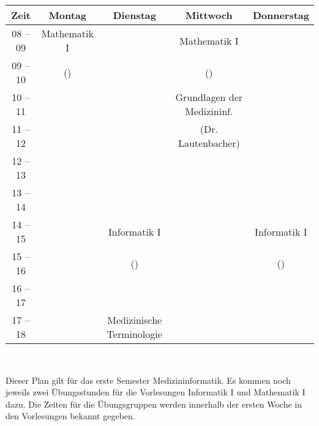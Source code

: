 \begin{minipage}{\textwidth}
    \footnotesize
\begin{center}
\begin{tabular}{|c|c|c|c|c|} 
	\hline
	Zeit    & Montag       & Dienstag             & Mittwoch                          & Donnerstag                          \\ 
	\hline\hline
	08 – 09 & Mathematik I &                      & Mathematik I                      &                                   \\ 
	\cline{1-1}\cline{3-3}\cline{5-5}
	09 – 10 & (\Matheprof)      &                      & (\Matheprof)                           &   \\
	\hline
	10 – 11 &              &                      &     Grundlagen der Medizininf.                              &                                   \\ 
	\cline{1-3}\cline{5-5}
	11 – 12 &              &                      &    (Dr. Lautenbacher)             &                                   \\ 
	\hline
	12 – 13 &              &                      &                                   &                                   \\ 
	\hline
	13 – 14 &              &                      &                                   &                                   \\ 
	\hline
	14 – 15 &              & Informatik I  &  &      Informatik I                             \\ 
	\cline{1-2}\cline{4-4}
	15 – 16 &              & (\Infoprof)              &          &  (\Infoprof)                \\ 
	\hline
	16 – 17 &              &                      &                                   &                                   \\ 
	\hline
	17 – 18 &              &   Medizinische Terminologie    &  &                                   \\
	\hline
\end{tabular}
    ~\\
\scriptsize %
\end{center}
\end{minipage}
Dieser Plan gilt für das erste Semester Medizininformatik. Es kommen noch jeweils zwei Übungsstunden für die Vorlesungen 
Informatik I und Mathematik I dazu. Die Zeiten für die Übungsgruppen werden innerhalb der ersten Woche in den Vorlesungen bekannt gegeben.
